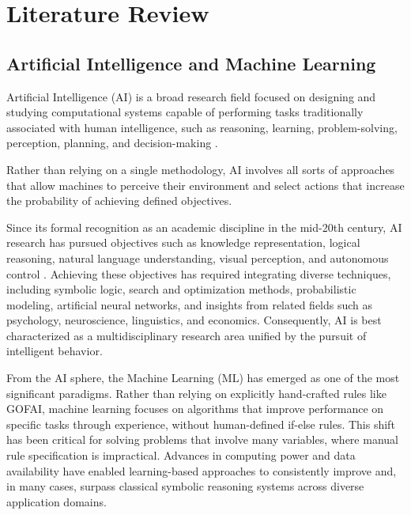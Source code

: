 
\newpage
\section{Literature Review}

\subsection{Artificial Intelligence and Machine Learning}

Artificial Intelligence (AI) is a broad research field focused on designing and studying computational systems capable of performing tasks traditionally associated with human intelligence, such as reasoning, learning, problem-solving, perception, planning, and decision-making \cite{russell2021}.


 Rather than relying on a single methodology, AI involves all sorts of approaches that allow machines to perceive their environment and select actions that increase the probability of achieving defined objectives.

Since its formal recognition as an academic discipline in the mid-20th century, AI research has pursued objectives such as knowledge representation, logical reasoning, natural language understanding, visual perception, and autonomous control \cite{russell2021}. Achieving these objectives has required integrating diverse techniques, including symbolic logic, search and optimization methods, probabilistic modeling, artificial neural networks, and insights from related fields such as psychology, neuroscience, linguistics, and economics. Consequently, AI is best characterized as a multidisciplinary research area unified by the pursuit of intelligent behavior.

From the AI sphere, the Machine Learning (ML) has emerged as one of the most significant paradigms. Rather than relying on explicitly hand-crafted rules like GOFAI, machine learning focuses on algorithms that improve performance on specific tasks through experience, without human-defined if-else rules. This shift has been critical for solving problems that involve many variables, where manual rule specification is impractical. Advances in computing power and data availability have enabled learning-based approaches to consistently improve and, in many cases, surpass classical symbolic reasoning systems across diverse application domains.

